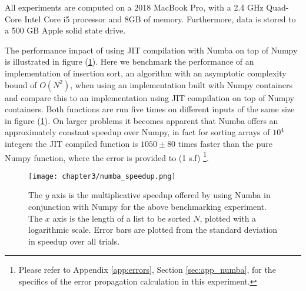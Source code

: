 All experiments are computed on a 2018 MacBook Pro, with a 2.4 GHz Quad-Core
Intel Core i5 processor and 8GB of memory. Furthermore, data is stored to a
500 GB Apple solid state drive.

The performance impact of using \gls{JIT} compilation with Numba on top of Numpy
is illustrated in figure (\ref{fig:3_1_numba}). Here we benchmark the performance
of an implementation of insertion sort, an algorithm with an asymptotic complexity
bound of $O(N^2)$, when using an implementation built with Numpy containers and
compare this to an implementation using JIT compilation on top of Numpy containers.
Both functions are run five times on different inputs of the same size
in figure (\ref{fig:3_1_numba}). On larger problems it becomes apparent
that Numba offers an approximately constant speedup over Numpy, in fact for
sorting arrays of $10^4$ integers the JIT compiled function is $1050 \pm 80$
times faster than the pure Numpy function, where the error is provided to (1 s.f)
\footnote{Please refer to Appendix \ref{app:errors}, Section \ref{sec:app_numba},
for the specifics of the error propagation calculation in this experiment.}.

\begin{figure}[ht]
    \centering

  {\texttt{[image: chapter3/numba\_speedup.png]}}
  \vspace{0pt}
    \caption{The $y$ axis is the multiplicative speedup offered by using Numba in
    conjunction with Numpy for the above benchmarking experiment. The $x$ axis is
    the length of a list to be sorted $N$, plotted with a logarithmic scale. Error
    bars are plotted from the standard deviation in speedup over all trials.}
    \label{fig:3_1_numba}
\end{figure}

